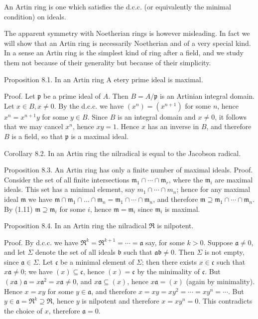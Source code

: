 \documentclass{standalone}
\theoremstyle{definition}
\theoremstyle{remark}
\begin{document}
An Artin ring is one which satisfies the d.c.c. (or equivalently the minimal condition) on ideals.

The apparent symmetry with Noetherian rings is however misleading. In fact we will show that an Artin ring is necessarily Noetherian and of a very special kind. In a sense an Artin ring is the simplest kind of ring after a field, and we study them not because of their generality but because of their simplicity.

Proposition 8.1. In an Artin ring A etery prime ideal is maximal.

Proof. Let $\mathfrak{p}$ be a prime ideal of $A$. Then $B=A / \mathfrak{p}$ is an Artinian integral domain. Let $x \in B, x \neq 0$. By the d.c.c. we have $\left(x^{n}\right)=\left(x^{n+1}\right)$ for some $n$, hence $x^{n}=x^{n+1} y$ for some $y \in B$. Since $B$ is an integral domain and $x \neq 0$, it follows that we may cancel $x^{n}$, hence $x y=1$. Hence $x$ has an inverse in $B$, and therefore $B$ is a field, so that $\mathfrak{p}$ is a maximal ideal.

Corollary 8.2. In an Artin ring the nilradical is equal to the Jacobson radical.

Proposition 8.3. An Artin ring has only a finite number of maximal ideals. Proof. Consider the set of all finite intersections $\mathfrak{m}_{1} \cap \cdots \cap \mathfrak{m}_{r}$, where the $\mathfrak{m}_{i}$ are maximal ideals. This set has a minimal element, say $m_{1} \cap \cdots \cap m_{n}$; hence for any maximal ideal $\mathfrak{m}$ we have $\mathfrak{m} \cap \mathfrak{m}_{1} \cap \ldots \cap \mathfrak{m}_{n}=\mathfrak{m}_{1} \cap \cdots \cap \mathfrak{m}_{n}$, and therefore $\mathfrak{m} \supseteq \mathfrak{m}_{1} \cap \cdots \cap \mathfrak{m}_{n}$. By (1.11) $\mathfrak{m} \supseteq \mathfrak{m}_{i}$ for some $i$, hence $\mathfrak{m}=\mathfrak{m}_{i}$ since $\mathfrak{m}_{i}$ is maximal.

Proposition 8.4. In an Artin ring the nilradical $\mathfrak{R}$ is nilpotent.

Proof. By d.c.c. we have $\mathfrak{\Re}^{k}=\mathfrak{R}^{k+1}=\cdots=\mathfrak{a}$ say, for some $k>0$. Suppose $\mathfrak{a} \neq 0$, and let $\Sigma$ denote the set of all ideals $\mathfrak{b}$ such that $\mathfrak{a} \mathfrak{b} \neq 0$. Then $\Sigma$ is not empty, since $\mathfrak{a} \in \Sigma$. Let $\mathfrak{c}$ be a minimal element of $\Sigma$; then there exists $x \in \mathfrak{c}$ such that $x \mathfrak{a} \neq 0$; we have $(x) \subseteq \mathfrak{c}$, hence $(x)=\mathfrak{c}$ by the minimality of $\mathfrak{c}$. But $(x \mathfrak{a}) \mathfrak{a}=x \mathfrak{a}^{2}=x \mathfrak{a} \neq 0$, and $x \mathfrak{a} \subseteq(x)$, hence $x \mathfrak{a}=(x)$ (again by minimality). Hence $x=x y$ for some $y \in \mathfrak{a}$, and therefore $x=x y=x y^{2}=\cdots=x y^{n}=\cdots$. But $y \in \mathfrak{a}=\mathfrak{R}^{k} \supseteq \mathfrak{R}$, hence $y$ is nilpotent and therefore $x=x y^{n}=0$. This contradicts the choice of $x$, therefore $\mathfrak{a}=0$.
\end{document}
